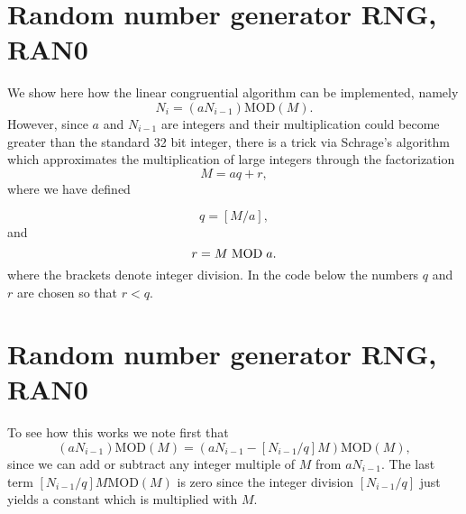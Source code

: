 \documentclass[%
oneside,                 %
final,                   %
10pt]{article}
\newenvironment{block_mdfboxadmon}[1][]{
\begin{block_mdfboxmdframed}[frametitle=#1]
}
{
\end{block_mdfboxmdframed}
}
\begin{document}
\section{Random number generator RNG, RAN0}

\begin{block_mdfboxadmon}[]

We show here how the linear congruential algorithm can be implemented, namely
\begin{equation*}
  N_i=(aN_{i-1}) \mathrm{MOD} (M).
\end{equation*}
However, since $a$ and $N_{i-1}$ are integers and their multiplication 
could become greater than the standard 32 bit integer, there is a trick via 
Schrage's algorithm which approximates the multiplication
of large integers through the factorization
\begin{equation*}
  M=aq+r,
\end{equation*}
where we have defined

\begin{equation*}
   q=[M/a],
\end{equation*}
and
\begin{equation*}
  r = M\hspace{0.1cm}\mathrm{MOD} \hspace{0.1cm}a.
\end{equation*}
where the brackets denote integer division. In the code below the numbers 
$q$ and $r$ are chosen so that $r < q$.
\end{block_mdfboxadmon} %





\section{Random number generator RNG, RAN0}

\begin{block_mdfboxadmon}[]

To see how this works we note first that
\begin{equation}
(aN_{i-1}) \mathrm{MOD} (M)= (aN_{i-1}-[N_{i-1}/q]M)\mathrm{MOD} (M),
\label{eq:rntrick1}
\end{equation}
since we can add or subtract any integer multiple of $M$ from $aN_{i-1}$.
The last term $[N_{i-1}/q]M\mathrm{MOD}(M)$ is zero since the integer division 
$[N_{i-1}/q]$ just yields a constant which is multiplied with $M$.
\end{block_mdfboxadmon} %
\end{document}
